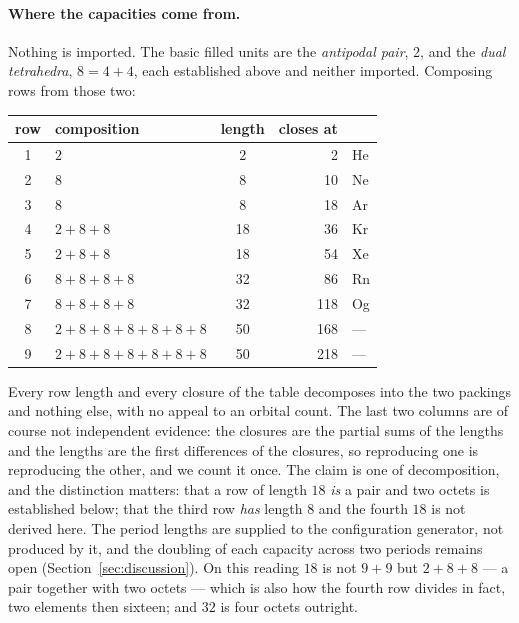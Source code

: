 \documentclass[11pt]{article}
\begin{document}
\paragraph{Where the capacities come from.} Nothing is imported. The basic filled units are the
\emph{antipodal pair}, $2$, and the \emph{dual tetrahedra}, $8=4{+}4$, each established above and
neither imported. Composing rows from those two:
\begin{center}\small
\begin{tabular}{clcrl}
\hline
row & composition & length & closes at & \\
\hline
1 & $2$                                & 2  & 2   & He \\
2 & $8$                                & 8  & 10  & Ne \\
3 & $8$                                & 8  & 18  & Ar \\
4 & $2+8+8$                            & 18 & 36  & Kr \\
5 & $2+8+8$                            & 18 & 54  & Xe \\
6 & $8+8+8+8$                          & 32 & 86  & Rn \\
7 & $8+8+8+8$                          & 32 & 118 & Og \\
8 & $2+8+8+8+8+8+8$                    & 50 & 168 & --- \\
9 & $2+8+8+8+8+8+8$                    & 50 & 218 & --- \\
\hline
\end{tabular}
\end{center}
Every row length and every closure of the table decomposes into the two packings and nothing
else, with no appeal to an orbital count. The last two columns are of course not independent
evidence: the closures are the partial sums of the lengths and the lengths are the first
differences of the closures, so reproducing one is reproducing the other, and we count it once. The claim is one of decomposition, and the distinction
matters: that a row of length $18$ \emph{is} a pair and two octets is established below; that the
third row \emph{has} length $8$ and the fourth $18$ is not derived here. The period lengths are
supplied to the configuration generator, not produced by it, and the doubling of each capacity
across two periods remains open (Section~\ref{sec:discussion}). On this reading $18$ is not $9{+}9$ but $2{+}8{+}8$ --- a pair
together with two octets --- which is also how the fourth row divides in fact, two elements then
sixteen; and $32$ is four octets outright.
\end{document}
